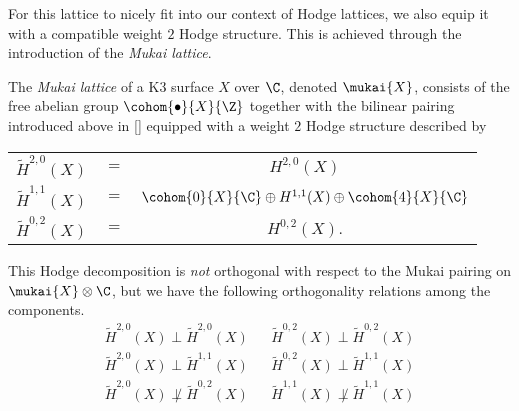 For this lattice to nicely fit into our context of Hodge lattices, we also equip it with a compatible weight $2$ Hodge structure. This is achieved through the introduction of the \emph{Mukai lattice}. 

\begin{definition}
    The \emph{Mukai lattice} of a K3 surface $X$ over $\C$, denoted $\mukai{X}$, consists of the free abelian group $\cohom{\bullet}{X}{\Z}$ together with the bilinear pairing introduced above in \eqref{} equipped with a weight $2$ Hodge structure described by 
\end{definition}

\begin{center}
    \begin{tabular}{r c c}
        $\widetilde{H}^{2,0}(X)$ & $=$ & $H^{2,0}(X)$ \\
        $\widetilde{H}^{1,1}(X)$ & $=$ & $\cohom{0}{X}{\C} \oplus H^{1,1}(X) \oplus \cohom{4}{X}{\C}$ \\
        $\widetilde{H}^{0,2}(X)$ & $=$ & $H^{0,2}(X)$.
    \end{tabular}
\end{center}

\begin{remark}
    This Hodge decomposition is \emph{not} orthogonal with respect to the Mukai pairing on $\mukai{X} \otimes \C$, but we have the following orthogonality relations among the components. 
    \begin{align*}
        \widetilde{H}^{2,0}(X) \perp \widetilde{H}^{2,0}(X) & & \widetilde{H}^{0,2}(X) \perp \widetilde{H}^{0,2}(X) \\
        \widetilde{H}^{2,0}(X) \perp \widetilde{H}^{1,1}(X) & &\widetilde{H}^{0,2}(X) \perp \widetilde{H}^{1,1}(X) \\
        \widetilde{H}^{2,0}(X) \not\perp \widetilde{H}^{0,2}(X) & &\widetilde{H}^{1,1}(X) \not\perp \widetilde{H}^{1,1}(X)
    \end{align*}
\end{remark}

